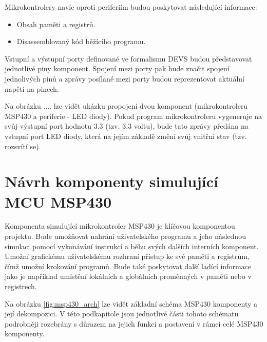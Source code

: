 Mikrokontrolery navíc oproti periferiím budou poskytovat následující informace:

\begin{itemize}
\item Obsah paměti a registrů.
\item Disassemblovaný kód běžícího programu.
\end{itemize}

Vstupní a výstupní porty definované ve formalismu DEVS budou představovat jednotlivé piny komponent. Spojení mezi porty pak bude značit spojení jednolivých
pinů a zprávy posílané mezi porty budou reprezentovat aktuální napětí na pinech.

Na obrázku .... lze vidět ukázku propojení dvou komponent (mikrokontroleru MSP430 a periferie - LED diody). Pokud program mikrokontroleru vygeneruje na svůj 
výstupní port hodnotu 3.3 (tzv. 3.3 voltu), bude tato zprávy předána na vstupní port LED diody, která na jejím základě změní svůj vnitřní stav (tzv. rozsvítí se).

\section{Návrh komponenty simulující MCU MSP430}

Komponenta simulující mikrokontroler MSP430 je klíčovou komponentou projektu. Bude umožňovat nahrání uživatelského programu a jeho
následnou simulaci pomocí vykonávání instrukcí a běhu svých dalších interních komponent. Umožní grafickému uživatelskému
rozhraní přístup ke své paměti a registrům, čímž umožní krokování programů. Bude také poskytovat další ladící informace jako je například
umístění lokálních a globálních proměnných v paměti nebo v registrech. \cite{cvs}

Na obrázku \ref{fig:msp430_arch} lze vidět základní schéma MSP430 komponenty a její dekompozici. V této podkapitole jsou jednotlivé části tohoto schématu podrobněji rozebrány s důrazem na jejich funkci a postavení v rámci celé MSP430 komponenty.

